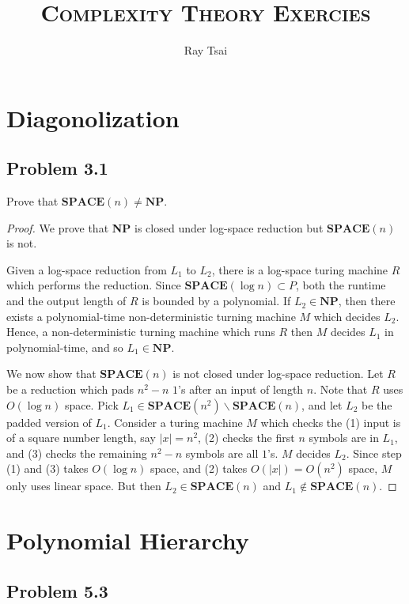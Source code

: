 \documentclass[a4paper]{article}
\title{\textsc{Complexity Theory Exercies}}
\author{Ray Tsai}
\date{}
\begin{document}
\maketitle

\section*{Diagonolization}

\subsection*{Problem 3.1} 

Prove that $\textbf{SPACE}(n) \neq \textbf{NP}$.

\begin{proof}
  We prove that \textbf{NP} is closed under log-space reduction but $\textbf{SPACE}(n)$ is not. 

  Given a log-space reduction from $L_1$ to $L_2$, there is a log-space turing machine $R$ which
  performs the reduction. Since $\textbf{SPACE}(\log n) \subset P$, both the runtime and the output
  length of $R$ is bounded by a polynomial. If $L_2 \in \textbf{NP}$, then there exists a
  polynomial-time non-deterministic turning machine $M$ which decides $L_2$. Hence, a
  non-deterministic turning machine which runs $R$ then $M$ decides $L_1$ in polynomial-time, and so
  $L_1 \in \textbf{NP}$. 

  We now show that $\textbf{SPACE}(n)$ is not closed under log-space reduction. Let $R$ be a
  reduction which pads $n^2 - n$ $1$'s after an input of length $n$. Note that $R$ uses $O(\log n)$
  space. Pick $L_1 \in \textbf{SPACE}(n^2) \backslash \textbf{SPACE}(n)$, and let $L_2$ be the
  padded version of $L_1$. Consider a turing machine $M$ which checks the (1) input is of a square
  number length, say $|x| = n^2$, (2) checks the first $n$ symbols are in $L_1$, and (3) checks the
  remaining $n^2 - n$ symbols are all $1$'s. $M$ decides $L_2$. Since step (1) and (3) takes $O(\log
  n)$ space, and (2) takes $O(|x|) = O(n^2)$ space, $M$ only uses linear space. But then $L_2 \in
  \textbf{SPACE}(n)$ and $L_1 \notin \textbf{SPACE}(n)$. 
\end{proof}

\section*{Polynomial Hierarchy}

\subsection*{Problem 5.3}
\end{document}
